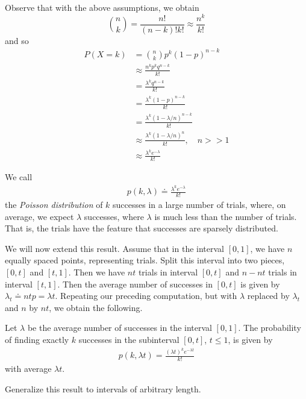 Observe that with the above assumptions, we obtain
\begin{equation*}
	\binom{n}{k} = \frac{n!}{(n-k)! k!} \approx \frac{n^k}{k!}
\end{equation*}
and so
\begin{align*}
	P(X = k)
	& = \binom{n}{k} p^k {(1 - p)}^{n-k} \\
	& \approx \frac{n^k p^k q^{n-k}}{k!} \\
	& = \frac{\lambda^k q^{n-k}}{k!} \\
	& = \frac{\lambda^k {(1-p)}^{n-k}}{k!} \\
	& = \frac{\lambda^k {(1-\lambda/n)}^{n-k}}{k!} \\
	& \approx \frac{\lambda^k {(1-\lambda/n)}^{n}}{k!} , \quad n >> 1\\
	& \approx \frac{\lambda^k e^{-\lambda}}{k!}
\end{align*}
\begin{definition}
	We call
	\begin{align*}
		p(k, \lambda) \doteq \frac{\lambda^k e^{-\lambda}}{k!}
	\end{align*}
	the \emph{Poisson distribution} of $k$ successes in a large number
	of trials, where, on average, we expect $\lambda$ successes,
	where $\lambda$ is much less than the number of trials.
	That is, the trials have the feature that successes are
	sparsely distributed.
\end{definition}
We will now extend this result. Assume that in the interval $[0,1]$,
we have $n$ equally spaced points, representing trials. Split this interval 
into two pieces,
$[0,t]$ and $[t, 1]$. Then we have $nt$ trials in interval $[0,t]$ and
$n - nt$ trials in interval $[t,1]$. Then the average number of successes
in $[0,t]$ is given by $\lambda_t \doteq n t p = \lambda t$. Repeating
our preceding computation, but with $\lambda$ replaced by $\lambda_t$
and $n$ by $nt$, we obtain the following.
\begin{theorem}
	Let $\lambda$ be the average number of successes in the interval $[0,1]$.
	The probability of finding exactly $k$ successes  in the subinterval 
	$[0,t]$,
	$t \le 1$, is given by
	\begin{align*}
		p(k, \lambda t) = \frac{{(\lambda t)}^{k} e^{-\lambda t}}{k!}
	\end{align*}
	with average $\lambda t$.
\end{theorem}
\begin{exercise}
	Generalize this result to intervals of arbitrary length.
\end{exercise}
